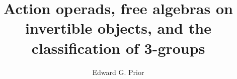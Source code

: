\documentclass[a4paper,12pt,times,numbered,print,index]{Style/PhDThesisPSnPDF}
\title{Action operads, free algebras on invertible objects, and the classification of 3-groups}
\author{Edward G. Prior}
\numberwithin{equation}{section}
\theoremstyle{example}
\begin{document}
 


\frontmatter

\maketitle



\begin{abstract}
\end{abstract}

\tableofcontents



\mainmatter


  











   
\end{document}
